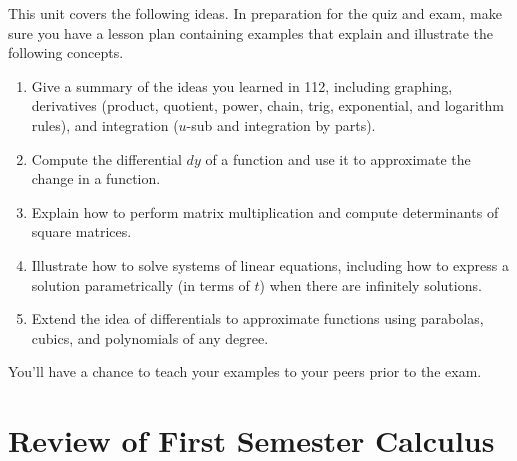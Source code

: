 This unit covers the following ideas. In preparation for the quiz and exam, make sure you have a lesson plan containing examples that explain and illustrate the following concepts.  \begin{enumerate}
\item Give a summary of the ideas you learned in 112, including graphing, derivatives (product, quotient, power, chain, trig, exponential, and logarithm rules), and integration ($u$-sub and integration by parts).
\item Compute the differential $dy$ of a function and use it to approximate the change in a function. 
\item Explain how to perform matrix multiplication and compute determinants of square matrices.
\item Illustrate how to solve systems of linear equations, including how to express a solution parametrically (in terms of $t$) when there are infinitely solutions.
\item Extend the idea of differentials to approximate functions using parabolas, cubics, and polynomials of any degree.
\end{enumerate}
You'll have a chance to teach your examples to your peers prior to the exam.

%

\section{Review of First Semester Calculus}

